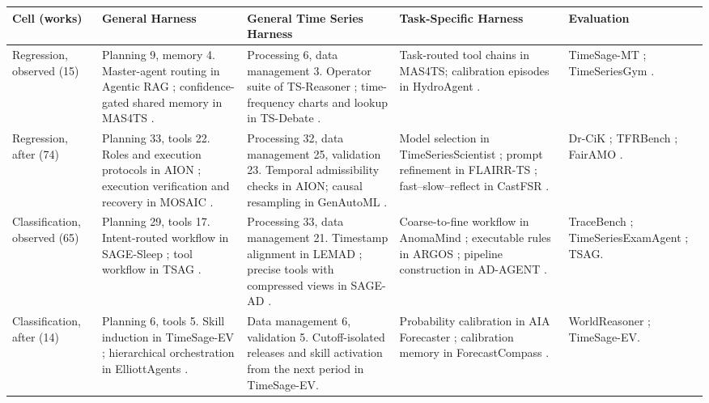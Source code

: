 \documentclass[preprints,article,submit,moreauthors]{Definitions/mdpi}
\begin{document}
\begin{table}[t]
\centering\scriptsize
\setlength{\tabcolsep}{3pt}
\renewcommand{\arraystretch}{1.15}
\renewcommand{\tabularxcolumn}[1]{p{#1}}
\begin{tabularx}{\textwidth}{@{}>{\raggedright\arraybackslash}p{}>{\raggedright\arraybackslash}X>{\raggedright\arraybackslash}X>{\raggedright\arraybackslash}p{}>{\raggedright\arraybackslash}p{}@{}}
\toprule
\textbf{Cell (works)} & \textbf{General Harness} & \textbf{General Time Series Harness} & \textbf{Task-Specific Harness} & \textbf{Evaluation}\\
\midrule
Regression, observed (15) & Planning 9, memory 4. Master-agent routing in Agentic RAG \citep{agenticrag2024}; confidence-gated shared memory in MAS4TS \citep{mas4ts2026}. & Processing 6, data management 3. Operator suite of TS-Reasoner \citep{tsreasoner2026}; time-frequency charts and lookup in TS-Debate \citep{multimodaldebate2026}. & Task-routed tool chains in MAS4TS; calibration episodes in HydroAgent \citep{hydroagentcalibration2026}. & TimeSage-MT \citep{timesagemt2026}; TimeSeriesGym \citep{timeseriesgym2025}.\\
Regression, after (74) & Planning 33, tools 22. Roles and execution protocols in AION \citep{aion2026}; execution verification and recovery in MOSAIC \citep{mosaic2026}. & Processing 32, data management 25, validation 23. Temporal admissibility checks in AION; causal resampling in GenAutoML \citep{genautoml2026}. & Model selection in TimeSeriesScientist \citep{timeseriesscientist2025}; prompt refinement in FLAIRR-TS \citep{flairr2025}; fast--slow--reflect in CastFSR \citep{castfsr2026}. & Dr-CiK \citep{drcik2026}; TFRBench \citep{tfrbench2026}; FairAMO \citep{fairamo2026}.\\
Classification, observed (65) & Planning 29, tools 17. Intent-routed workflow in SAGE-Sleep \citep{sagesleep2026}; tool workflow in TSAG \citep{tsag2026}. & Processing 33, data management 21. Timestamp alignment in LEMAD \citep{ji2025lemad}; precise tools with compressed views in SAGE-AD \citep{sagead2026}. & Coarse-to-fine workflow in AnomaMind \citep{anomamind2026}; executable rules in ARGOS \citep{argos2025}; pipeline construction in AD-AGENT \citep{adagent2025}. & TraceBench \citep{tracebench2026}; TimeSeriesExamAgent \citep{timeseriesexamagent2026}; TSAG.\\
Classification, after (14) & Planning 6, tools 5. Skill induction in TimeSage-EV \citep{timesageev2026}; hierarchical orchestration in ElliottAgents \citep{elliottagents2025}. & Data management 6, validation 5. Cutoff-isolated releases and skill activation from the next period in TimeSage-EV. & Probability calibration in AIA Forecaster \citep{aiaforecaster2025}; calibration memory in ForecastCompass \citep{forecastcompass2026}. & WorldReasoner \citep{worldreasoner2026}; TimeSage-EV.\\

\end{tabularx}
\end{table}
\end{document}
